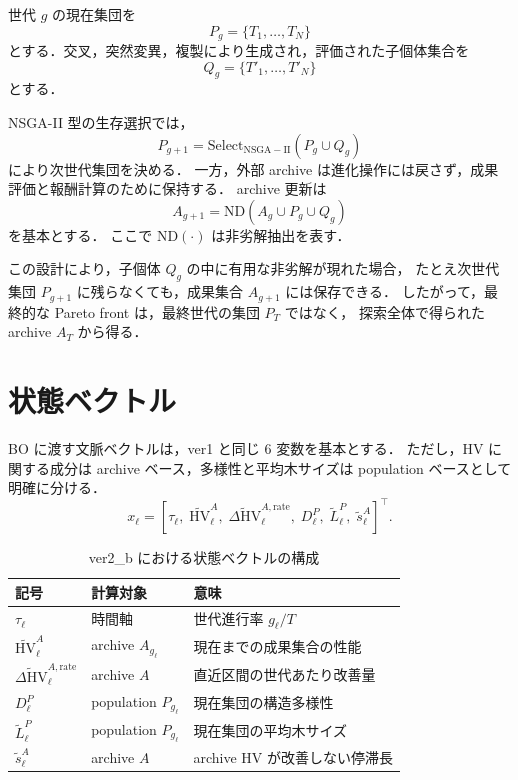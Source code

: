 \documentclass[a4paper,11pt]{ltjsarticle}
\newcommand{\HV}{\mathrm{HV}}
\newcommand{\ND}{\mathrm{ND}}
\begin{document}
世代 \(g\) の現在集団を
\begin{equation}
P_g=\{T_1,\dots,T_N\}
\end{equation}
とする．交叉，突然変異，複製により生成され，評価された子個体集合を
\begin{equation}
Q_g=\{T'_1,\dots,T'_N\}
\end{equation}
とする．

NSGA-II 型の生存選択では，
\begin{equation}
P_{g+1}
=
\mathrm{Select}_{\mathrm{NSGA-II}}(P_g\cup Q_g)
\end{equation}
により次世代集団を決める．
一方，外部 archive は進化操作には戻さず，成果評価と報酬計算のために保持する．
archive 更新は
\begin{equation}
A_{g+1}
=
\ND(A_g\cup P_g\cup Q_g)
\end{equation}
を基本とする．
ここで \(\ND(\cdot)\) は非劣解抽出を表す．

この設計により，子個体 \(Q_g\) の中に有用な非劣解が現れた場合，
たとえ次世代集団 \(P_{g+1}\) に残らなくても，成果集合 \(A_{g+1}\) には保存できる．
したがって，最終的な Pareto front は，最終世代の集団 \(P_T\) ではなく，
探索全体で得られた archive \(A_T\) から得る．

\section{状態ベクトル}

BO に渡す文脈ベクトルは，ver1 と同じ 6 変数を基本とする．
ただし，HV に関する成分は archive ベース，多様性と平均木サイズは population ベースとして明確に分ける．
\begin{equation}
x_\ell =
\left[
\tau_\ell,\;
\widetilde{\HV}^{A}_\ell,\;
\widetilde{\Delta \HV}^{A,\mathrm{rate}}_\ell,\;
D^{P}_\ell,\;
\widetilde{L}^{P}_\ell,\;
\widetilde{s}^{A}_\ell
\right]^\top .
\end{equation}

\begin{table}[htbp]
\centering
\caption{ver2\_b における状態ベクトルの構成}
\begin{tabular}{lll}
\toprule
記号 & 計算対象 & 意味 \\
\midrule
\(\tau_\ell\) & 時間軸 & 世代進行率 \(g_\ell/T\) \\
\(\widetilde{\HV}^{A}_\ell\) & archive \(A_{g_\ell}\) & 現在までの成果集合の性能 \\
\(\widetilde{\Delta \HV}^{A,\mathrm{rate}}_\ell\) & archive \(A\) & 直近区間の世代あたり改善量 \\
\(D^{P}_\ell\) & population \(P_{g_\ell}\) & 現在集団の構造多様性 \\
\(\widetilde{L}^{P}_\ell\) & population \(P_{g_\ell}\) & 現在集団の平均木サイズ \\
\(\widetilde{s}^{A}_\ell\) & archive \(A\) & archive HV が改善しない停滞長 \\
\bottomrule
\end{tabular}
\end{table}
\end{document}
